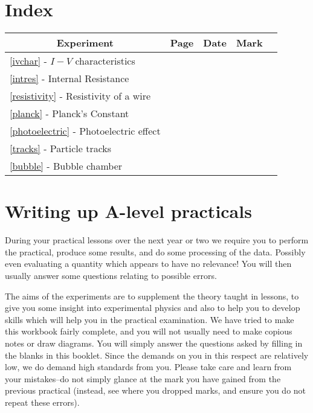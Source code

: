 \documentclass[a4paper,12pt,twoside]{exam}
\begin{document}
\section*{Index}
\renewcommand{\arraystretch}{2}
\begin{center}
\begin{tabular}{|l|c|p{2.5cm}|p{2cm}|c|}
\hline
\multicolumn{1}{|c|}{\bf Experiment} & \multicolumn{1}{|c|}{\bf Page} & \multicolumn{1}{|c|}{\bf Date} & \multicolumn{1}{|c|}{\bf Mark}\\
\hline
\ref{ivchar} - $I-V$ characteristics & \pageref{ivchar} & & \\
\hline
\ref{intres} - Internal Resistance & \pageref{intres} & & \\
\hline
\ref{resistivity} - Resistivity of a wire & \pageref{resistivity} & &\\
\hline
\ref{planck} - Planck's Constant & \pageref{planck} & & \\
\hline
\ref{photoelectric} - Photoelectric effect & \pageref{photoelectric} & & \\
\hline
\ref{tracks} - Particle tracks & \pageref{tracks} & &\\
\hline
\ref{bubble} - Bubble chamber & \pageref{bubble} & &\\
\hline
\end{tabular}
\end{center}

\section*{Writing up A-level practicals}

During your practical lessons over the next year or two we require you to perform the practical, produce some results, and do some processing of the data.  Possibly even evaluating a quantity which appears to have no relevance!  You will then usually answer some questions relating to possible errors.

The aims of the experiments are to supplement the theory taught in lessons, to give you some insight into experimental physics and also to help you to develop skills which will help you in the practical examination.  We have tried to make this workbook fairly complete, and you will not usually need to make copious notes or draw diagrams.  You will simply answer the questions asked by filling in the blanks in this booklet.  Since the demands on you in this respect are relatively low, we do demand high standards from you. Please take care and learn from your mistakes--do not simply glance at the mark you have gained from the previous practical (instead, see where you dropped marks, and ensure you do not repeat these errors).
\end{document}
